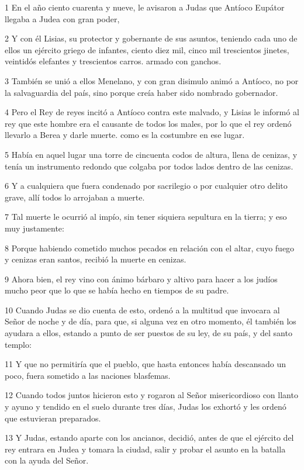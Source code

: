 \par 1 En el año ciento cuarenta y nueve, le avisaron a Judas que Antíoco Eupátor llegaba a Judea con gran poder,
\par 2 Y con él Lisias, su protector y gobernante de sus asuntos, teniendo cada uno de ellos un ejército griego de infantes, ciento diez mil, cinco mil trescientos jinetes, veintidós elefantes y trescientos carros. armado con ganchos.
\par 3 También se unió a ellos Menelano, y con gran disimulo animó a Antíoco, no por la salvaguardia del país, sino porque creía haber sido nombrado gobernador.
\par 4 Pero el Rey de reyes incitó a Antíoco contra este malvado, y Lisias le informó al rey que este hombre era el causante de todos los males, por lo que el rey ordenó llevarlo a Berea y darle muerte. como es la costumbre en ese lugar.
\par 5 Había en aquel lugar una torre de cincuenta codos de altura, llena de cenizas, y tenía un instrumento redondo que colgaba por todos lados dentro de las cenizas.
\par 6 Y a cualquiera que fuera condenado por sacrilegio o por cualquier otro delito grave, allí todos lo arrojaban a muerte.
\par 7 Tal muerte le ocurrió al impío, sin tener siquiera sepultura en la tierra; y eso muy justamente:
\par 8 Porque habiendo cometido muchos pecados en relación con el altar, cuyo fuego y cenizas eran santos, recibió la muerte en cenizas.
\par 9 Ahora bien, el rey vino con ánimo bárbaro y altivo para hacer a los judíos mucho peor que lo que se había hecho en tiempos de su padre.
\par 10 Cuando Judas se dio cuenta de esto, ordenó a la multitud que invocara al Señor de noche y de día, para que, si alguna vez en otro momento, él también los ayudara a ellos, estando a punto de ser puestos de su ley, de su país, y del santo templo:
\par 11 Y que no permitiría que el pueblo, que hasta entonces había descansado un poco, fuera sometido a las naciones blasfemas.
\par 12 Cuando todos juntos hicieron esto y rogaron al Señor misericordioso con llanto y ayuno y tendido en el suelo durante tres días, Judas los exhortó y les ordenó que estuvieran preparados.
\par 13 Y Judas, estando aparte con los ancianos, decidió, antes de que el ejército del rey entrara en Judea y tomara la ciudad, salir y probar el asunto en la batalla con la ayuda del Señor.
